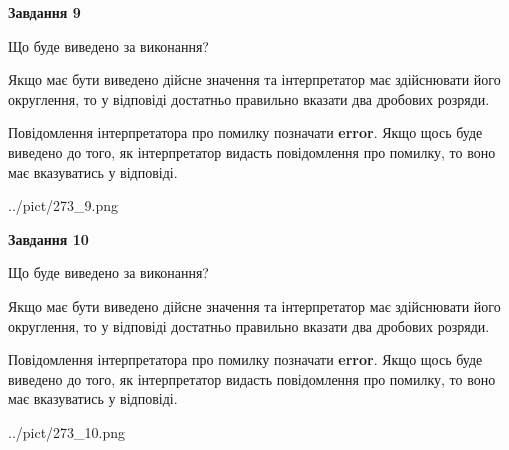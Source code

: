 \documentclass[12pt, ukrainian]{article}
\begin{document}
{\begin {Large}
{\begin {center}\textbf{Завдання 9}\end {center}}\par
Що буде виведено за виконання? \par

Якщо має бути виведено дійсне значення та інтерпретатор має здійснювати його округлення, 
то у відповіді достатньо правильно вказати два дробових розряди.

Повідомлення інтерпретатора про помилку позначати \textbf{error}.
Якщо щось буде виведено до того, як інтерпретатор видасть повідомлення про помилку, 
то воно має вказуватись у відповіді. \par

\begin{center}
	{../pict/273_9.png}
\end{center}
\newpage

{\begin {center}\textbf{Завдання 10}\end {center}}\par
Що буде виведено за виконання? \par

Якщо має бути виведено дійсне значення та інтерпретатор має здійснювати його округлення, 
то у відповіді достатньо правильно вказати два дробових розряди.

Повідомлення інтерпретатора про помилку позначати \textbf{error}.
Якщо щось буде виведено до того, як інтерпретатор видасть повідомлення про помилку, 
то воно має вказуватись у відповіді. \par

\begin{center}
	{../pict/273_10.png}
\end{center}
\newpage

\end {Large}}
\end{document}
